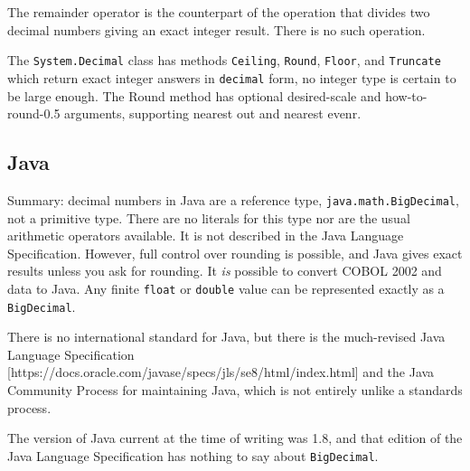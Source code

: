 \documentclass{article}
\begin{document}
The remainder operator is the counterpart of the operation that
divides two decimal numbers giving an exact integer result.
There is no such operation.

The {\tt System.Decimal} class has methods {\tt Ceiling},
{\tt Round}, {\tt Floor}, and {\tt Truncate} which return exact
integer answers in {\tt decimal} form, no integer
type is certain to be large enough.  The Round method has
optional desired-scale and how-to-round-0.5 arguments,
supporting nearest out and nearest evenr.


\subsection{Java}

Summary: decimal numbers in Java are a reference type,
{\tt java.math.BigDecimal}, not a primitive type.
There are no literals for this type nor
are the usual arithmetic operators available.
It is not described in the Java Language Specification.
However, full control over rounding is possible, and
Java gives exact results unless you ask for rounding.
It {\it is} possible to convert COBOL 2002 and data to
Java.  Any finite {\tt float} or {\tt double} value can
be represented exactly as a {\tt BigDecimal}.

There is no international standard for Java, but there is the
much-revised Java Language Specification
[https://docs.oracle.com/javase/specs/jls/se8/html/index.html]
and the Java Community Process for maintaining Java, which is not
entirely unlike a standards process.

The version of Java current at the time of writing was 1.8,
and that edition of the Java Language Specification has nothing to say
about {\tt BigDecimal}.
\end{document}
